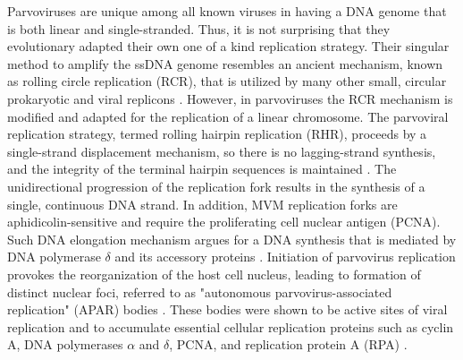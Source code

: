 Parvoviruses are unique among all known viruses in having a DNA genome that is both linear and single-stranded. Thus, it is not surprising that they evolutionary adapted their own one of a kind replication strategy. Their singular method to amplify the ssDNA genome resembles an ancient mechanism, known as rolling circle replication (RCR), that is utilized by many other small, circular prokaryotic and viral replicons \cite{pmid1630899, pmid8374079, pmid8824773, pmid9092519, pmid9010307}. However, in parvoviruses the RCR mechanism is modified and adapted for the replication of a linear chromosome. The parvoviral replication strategy, termed rolling hairpin replication (RHR), proceeds by a single-strand displacement mechanism, so there is no lagging-strand synthesis, and the integrity of the terminal hairpin sequences is maintained \cite{pmid967244}. The unidirectional progression of the replication fork results in the synthesis of a single, continuous DNA strand. In addition, MVM replication forks are aphidicolin-sensitive and require the proliferating cell nuclear antigen (PCNA). Such DNA elongation mechanism argues for a DNA synthesis that is mediated by DNA polymerase $\delta$ and its accessory proteins \cite{pmid10792046, pmid12050365, pmid9525597}. Initiation of parvovirus replication provokes the reorganization of the host cell nucleus, leading to formation of distinct nuclear foci, referred to as "autonomous parvovirus-associated replication" (APAR) bodies \cite{pmid11287588, pmid10775619, pmid11907229}. These bodies were shown to be active sites of viral replication and to accumulate essential cellular replication proteins such as cyclin A, DNA polymerases $\alpha$ and $\delta$, PCNA, and replication protein A (RPA) \cite{pmid10792046}. 

